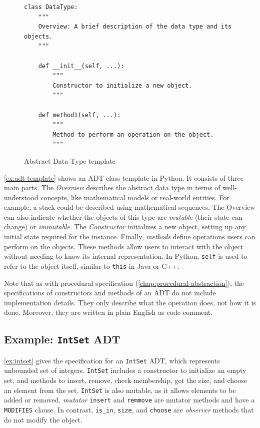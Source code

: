 \documentclass[oneside,11pt,dvipsnames]{book}
\newcommand{\code}[1]{\texttt{#1}}
\begin{document}
\begin{figure}
    \begin{lstlisting}
class DataType:
    """
    Overview: A brief description of the data type and its objects.
    """

    def __init__(self, ...):
        """
        Constructor to initialize a new object.
        """

    def method1(self, ...):
        """
        Method to perform an operation on the object.
        """
    \end{lstlisting}
    \caption{Abstract Data Type template}\label{ex:adt-template}
\end{figure}


\autoref{ex:adt-template} shows an ADT class template in Python. It consists of three main parts. The \emph{Overview} describes the abstract data type in terms of well-understood concepts, like mathematical models or real-world entities. For example, a stack could be described using mathematical sequences.
The Overview can also indicate whether the objects of this type are \emph{mutable} (their state can change) or \emph{immutable}.
The \emph{Constructor} initializes a new object, setting up any initial state required for the instance.
Finally, \emph{methods} define operations users can perform on the objects. These methods allow users to interact with the object without needing to know its internal representation. In Python, \code{self} is used to refer to the object itself, similar to \code{this} in Java or C++.

Note that as with procedural specification (\autoref{chap:procedural-abstraction}), the specifications of constructors and methods of an ADT do not include implementation details. They only describe what the operation does, not how it is done. Moreover, they are written in plain English as code comment.


\subsection{Example: \code{IntSet} ADT}

\autoref{ex:intset} gives the specification for an \code{IntSet} ADT, which represents unbounded set of integers. \code{IntSet} includes a constructor to initialize an empty set, and methods to insert, remove, check membership, get the size, and choose an element from the set. \code{IntSet} is also mutable, as it allows elements to be added or removed. \emph{mutator} \code{insert} and \code{remmove} are mutator methods and have a \code{MODIFIES} clause.  In contrast, \code{is\_in}, \code{size}, and \code{choose} are \emph{observer} methods that do not modify the object.
\end{document}
